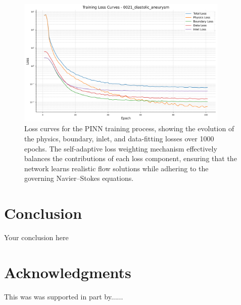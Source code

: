 \documentclass{article}
\begin{document}
\begin{figure}[H]
    \centering
    \scriptsize
    \includegraphics[width=0.9\textwidth]{0021_diastolic_aneurysm/0021_diastolic_aneurysm/loss_curves_0021_diastolic_aneurysm.png}
    \caption{Loss curves for the PINN training process, showing the evolution of the physics, boundary, inlet, and data-fitting losses over 1000 epochs. The self-adaptive loss weighting mechanism effectively balances the contributions of each loss component, ensuring that the network learns realistic flow solutions while adhering to the governing Navier--Stokes equations.}
    \label{fig:loss_curves1}
\end{figure}


\section{Conclusion}
Your conclusion here

\section*{Acknowledgments}
This was was supported in part by......

  
  
\end{document}
